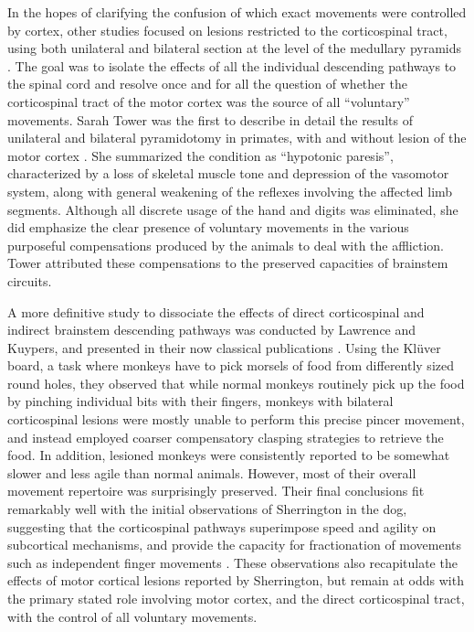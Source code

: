 In the hopes of clarifying the confusion of which exact movements were controlled by cortex, other studies focused on lesions restricted to the corticospinal tract, using both unilateral and bilateral section at the level of the medullary pyramids \cite{Tower1940,Lawrence1968,Lawrence1968a}. The goal was to isolate the effects of all the individual descending pathways to the spinal cord and resolve once and for all the question of whether the corticospinal tract of the motor cortex was the source of all ``voluntary'' movements. Sarah Tower was the first to describe in detail the results of unilateral and bilateral pyramidotomy in primates, with and without lesion of the motor cortex \cite{Tower1940}. She summarized the condition as ``hypotonic paresis'', characterized by a loss of skeletal muscle tone and depression of the vasomotor system, along with general weakening of the reflexes involving the affected limb segments. Although all discrete usage of the hand and digits was eliminated, she did emphasize the clear presence of voluntary movements in the various purposeful compensations produced by the animals to deal with the affliction. Tower attributed these compensations to the preserved capacities of brainstem circuits.

A more definitive study to dissociate the effects of direct corticospinal and indirect brainstem descending pathways was conducted by Lawrence and Kuypers, and presented in their now classical publications \cite{Lawrence1968,Lawrence1968a}. Using the Kl\"uver board, a task where monkeys have to pick morsels of food from differently sized round holes, they observed that while normal monkeys routinely pick up the food by pinching individual bits with their fingers, monkeys with bilateral corticospinal lesions were mostly unable to perform this precise pincer movement, and instead employed coarser compensatory clasping strategies to retrieve the food. In addition, lesioned monkeys were consistently reported to be somewhat slower and less agile than normal animals. However, most of their overall movement repertoire was surprisingly preserved. Their final conclusions fit remarkably well with the initial observations of Sherrington in the dog, suggesting that the corticospinal pathways superimpose speed and agility on subcortical mechanisms, and provide the capacity for fractionation of movements such as independent finger movements \cite{Lawrence1968}. These observations also recapitulate the effects of motor cortical lesions reported by Sherrington, but remain at odds with the primary stated role involving motor cortex, and the direct corticospinal tract, with the control of all voluntary movements.

